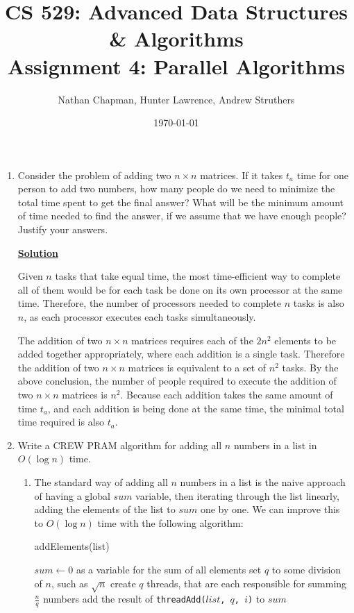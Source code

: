 \documentclass{article}
\title{\vspace*{-0.625in}CS 529: Advanced Data Structures \& Algorithms \\ Assignment 4: Parallel Algorithms}
\author{Nathan Chapman, Hunter Lawrence, Andrew Struthers}
\date{\today}
\renewcommand{\_}{\ifincsname_\else\legacyunderscore\fi}
\begin{document}
    \maketitle

\begin{enumerate}
	\item Consider the problem of adding two $n\times n$ matrices. If it takes $t_a$ time for one person to add two numbers, how many people do we need to minimize the total time spent to get the final answer? What will be the minimum amount of time needed to find the answer, if we assume that we have enough people? Justify your answers.
	
        \underline{\textbf{Solution}}

        Given $n$ tasks that take equal time, the most time-efficient way to complete all of them would be for each task be done on its own processor at the same time.  Therefore, the number of processors needed to complete $n$ tasks is also $n$, as each processor executes each tasks simultaneously.

        The addition of two $n \times n$ matrices requires each of the $2 n^2$ elements to be added together appropriately, where each addition is a single task.  Therefore the addition of two $n \times n$ matrices is equivalent to a set of $n^2$ tasks.  By the above conclusion, the number of people required to execute the addition of two $n \times n$ matrices is $n^2$. Because each addition takes the same amount of time $t_a$, and each addition is being done at the same time, the minimal total time required is also $t_a$.

	\item Write a CREW PRAM algorithm for adding all $n$ numbers in a list in $O(\log n)$ time.
	\begin{enumerate}
		\item The standard way of adding all $n$ numbers in a list is the naive approach of having a global $sum$ variable, then iterating through the list linearly, adding the elements of the list to $sum$ one by one. We can improve this to $O(\log n)$ time with the following algorithm:

	\begin{function}
            \DontPrintSemicolon
            \caption{addElements(list)}
            \label{alg:addElements}
            $sum \gets 0$ as a variable for the sum of all elements\;
            set $q$ to some division of $n$, such as $\sqrt{n}$\;
            create $q$ threads, that are each responsible for summing $\frac{n}{q}$ numbers\;
            {
                add the result of \texttt{threadAdd($list$, $q$, $i$)} to $sum$
            }
        \end{function}


\end{enumerate}
\end{enumerate}
\end{document}
